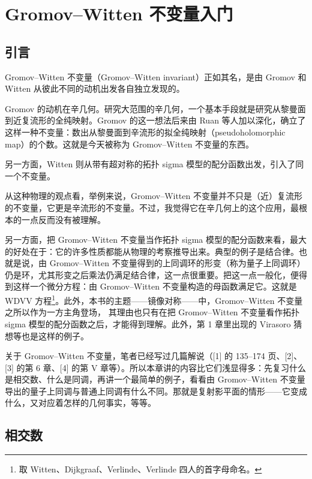 \chapter{Gromov--Witten 不变量入门}

\section{引言}

Gromov--Witten 不变量（Gromov--Witten invariant）正如其名，是由 Gromov 和 Witten 从彼此不同的动机出发各自独立发现的。

Gromov 的动机在辛几何。研究大范围的辛几何，一个基本手段就是研究从黎曼面到近复流形的全纯映射。Gromov 的这一想法后来由 Ruan 等人加以深化，确立了这样一种不变量：数出从黎曼面到辛流形的拟全纯映射（pseudoholomorphic map）的个数。这就是今天被称为 Gromov--Witten 不变量的东西。

另一方面，Witten 则从带有超对称的拓扑 sigma 模型的配分函数出发，引入了同一个不变量。

从这种物理的观点看，举例来说，Gromov--Witten 不变量并不只是（近）复流形的不变量，它更是辛流形的不变量。不过，我觉得它在辛几何上的这个应用，最根本的一点反而没有被理解。

另一方面，把 Gromov--Witten 不变量当作拓扑 sigma 模型的配分函数来看，最大的好处在于：它的许多性质都能从物理的考察推导出来。典型的例子是结合律。也就是说，由 Gromov--Witten 不变量得到的上同调环的形变（称为量子上同调环）仍是环，尤其形变之后乘法仍满足结合律，这一点很重要。把这一点一般化，便得到这样一个微分方程：由 Gromov--Witten 不变量构造的母函数满足它。这就是 WDVV 方程\footnote{取 Witten、Dijkgraaf、Verlinde、Verlinde 四人的首字母命名。}。此外，本书的主题——镜像对称——中，Gromov--Witten 不变量之所以作为一方主角登场，
其理由也只有在把 Gromov--Witten 不变量看作拓扑 sigma 模型的配分函数之后，才能得到理解。此外，第 1 章里出现的 Virasoro 猜想等也是这样的例子。

关于 Gromov--Witten 不变量，笔者已经写过几篇解说（[1] 的 135--174 页、[2]、[3] 的第 6 章、[4] 的第 V 章等）。所以本章讲的内容比它们浅显得多：先复习什么是相交数、什么是同调，再讲一个最简单的例子，看看由 Gromov--Witten 不变量导出的量子上同调与普通上同调有什么不同。那就是复射影平面的情形——它变成什么，又对应着怎样的几何事实，等等。

\section{相交数}

